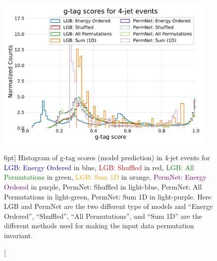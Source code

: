 \documentclass[a4paper, twoside, nobib]{tufte-book}
\newcommand{\q}[1]{``#1''}
\begin{document}
\begin{figure}
  \includegraphics[width=0.95\textwidth, trim=10 10 10 40, clip]{figures/quarks/gtag_y_pred_4_jet_hist-down_sample=1.00-ML_vars=vertex-selection=b-ejet_min=4-n_iter_RS_lgb=99-n_iter_RS_xgb=9-cdot_cut=0.90-version=19.pdf}
  \caption[g-tag scores in 4-jet events][6pt]
          {
            Histogram of g-tag scores (model prediction) in 4-jet events for \textcolor{blue}{LGB: Energy Ordered} in blue, \textcolor{red}{LGB: Shuffled} in red, \textcolor{green}{LGB: All Permutations} in green, \textcolor{orange}{LGB: Sum 1D} in orange, \textcolor{purple}{PermNet: Energy Ordered} in purple, \textcolor{light-blue}{PermNet: Shuffled} in light-blue, \textcolor{light-green}{PermNet: All Permutations} in light-green, \textcolor{light-purple}{PermNet: Sum 1D} in light-purple.  Here LGB and PermNet are the two different type of models and \q{Energy Ordered}, \q{Shuffled}, \q{All Permutations}, and \q{Sum 1D} are the different methods used for making the input data permutation invariant.  
          }   
  \label{fig:q:gtag_scores_4j}
\end{figure}
\end{document}
